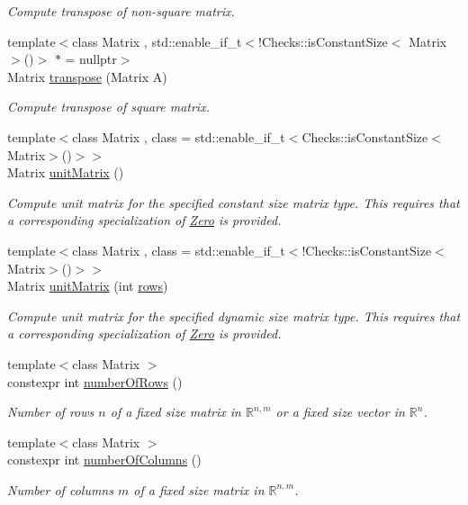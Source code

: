 \begin{DoxyCompactItemize}
\begin{DoxyCompactList}\small\item\em Compute transpose of non-\/square matrix. \end{DoxyCompactList}\item 
{\footnotesize template$<$class Matrix , std\+::enable\+\_\+if\+\_\+t$<$!\+Checks\+::is\+Constant\+Size$<$ Matrix $>$()$>$ $\ast$  = nullptr$>$ }\\Matrix \hyperlink{group__LinearAlgebraGroup_gac3427d39b75727a255e5ea387c50ff10}{transpose} (Matrix A)
\begin{DoxyCompactList}\small\item\em Compute transpose of square matrix. \end{DoxyCompactList}\item 
{\footnotesize template$<$class Matrix , class  = std\+::enable\+\_\+if\+\_\+t$<$\+Checks\+::is\+Constant\+Size$<$\+Matrix$>$()$>$$>$ }\\Matrix \hyperlink{group__LinearAlgebraGroup_ga88a596b8526c0ed98ce241244fb85948}{unit\+Matrix} ()
\begin{DoxyCompactList}\small\item\em Compute unit matrix for the specified constant size matrix type. This requires that a corresponding specialization of \hyperlink{structFunG_1_1Zero}{Zero} is provided. \end{DoxyCompactList}\item 
{\footnotesize template$<$class Matrix , class  = std\+::enable\+\_\+if\+\_\+t$<$!\+Checks\+::is\+Constant\+Size$<$\+Matrix$>$()$>$$>$ }\\Matrix \hyperlink{group__LinearAlgebraGroup_gae50c49f62ed072019079a7563688e5de}{unit\+Matrix} (int \hyperlink{namespaceFunG_1_1LinearAlgebra_abd3afa2fcd2194787342b2662cfa9f5a}{rows})
\begin{DoxyCompactList}\small\item\em Compute unit matrix for the specified dynamic size matrix type. This requires that a corresponding specialization of \hyperlink{structFunG_1_1Zero}{Zero} is provided. \end{DoxyCompactList}\item 
{\footnotesize template$<$class Matrix $>$ }\\constexpr int \hyperlink{namespaceFunG_1_1LinearAlgebra_ac1ff54cc5554748b5a9585c09745f139}{number\+Of\+Rows} ()
\begin{DoxyCompactList}\small\item\em Number of rows $n$ of a fixed size matrix in $\mathbb{R}^{n,m}$ or a fixed size vector in $\mathbb{R}^n$. \end{DoxyCompactList}\item 
{\footnotesize template$<$class Matrix $>$ }\\constexpr int \hyperlink{namespaceFunG_1_1LinearAlgebra_a4ed2c140b262ec0c33c93af62d65d1b1}{number\+Of\+Columns} ()
\begin{DoxyCompactList}\small\item\em Number of columns $m$ of a fixed size matrix in $\mathbb{R}^{n,m}$. \end{DoxyCompactList}\end{DoxyCompactItemize}



